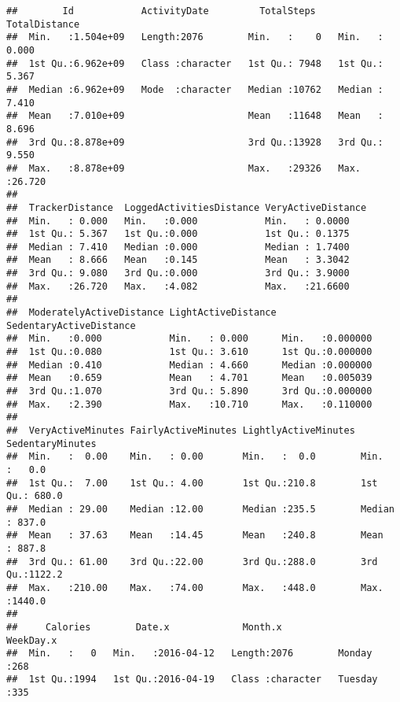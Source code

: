 \documentclass[
]{article}
\begin{document}
\begin{verbatim}
##        Id            ActivityDate         TotalSteps    TotalDistance   
##  Min.   :1.504e+09   Length:2076        Min.   :    0   Min.   : 0.000  
##  1st Qu.:6.962e+09   Class :character   1st Qu.: 7948   1st Qu.: 5.367  
##  Median :6.962e+09   Mode  :character   Median :10762   Median : 7.410  
##  Mean   :7.010e+09                      Mean   :11648   Mean   : 8.696  
##  3rd Qu.:8.878e+09                      3rd Qu.:13928   3rd Qu.: 9.550  
##  Max.   :8.878e+09                      Max.   :29326   Max.   :26.720  
##                                                                         
##  TrackerDistance  LoggedActivitiesDistance VeryActiveDistance
##  Min.   : 0.000   Min.   :0.000            Min.   : 0.0000   
##  1st Qu.: 5.367   1st Qu.:0.000            1st Qu.: 0.1375   
##  Median : 7.410   Median :0.000            Median : 1.7400   
##  Mean   : 8.666   Mean   :0.145            Mean   : 3.3042   
##  3rd Qu.: 9.080   3rd Qu.:0.000            3rd Qu.: 3.9000   
##  Max.   :26.720   Max.   :4.082            Max.   :21.6600   
##                                                              
##  ModeratelyActiveDistance LightActiveDistance SedentaryActiveDistance
##  Min.   :0.000            Min.   : 0.000      Min.   :0.000000       
##  1st Qu.:0.080            1st Qu.: 3.610      1st Qu.:0.000000       
##  Median :0.410            Median : 4.660      Median :0.000000       
##  Mean   :0.659            Mean   : 4.701      Mean   :0.005039       
##  3rd Qu.:1.070            3rd Qu.: 5.890      3rd Qu.:0.000000       
##  Max.   :2.390            Max.   :10.710      Max.   :0.110000       
##                                                                      
##  VeryActiveMinutes FairlyActiveMinutes LightlyActiveMinutes SedentaryMinutes
##  Min.   :  0.00    Min.   : 0.00       Min.   :  0.0        Min.   :   0.0  
##  1st Qu.:  7.00    1st Qu.: 4.00       1st Qu.:210.8        1st Qu.: 680.0  
##  Median : 29.00    Median :12.00       Median :235.5        Median : 837.0  
##  Mean   : 37.63    Mean   :14.45       Mean   :240.8        Mean   : 887.8  
##  3rd Qu.: 61.00    3rd Qu.:22.00       3rd Qu.:288.0        3rd Qu.:1122.2  
##  Max.   :210.00    Max.   :74.00       Max.   :448.0        Max.   :1440.0  
##                                                                             
##     Calories        Date.x             Month.x              WeekDay.x  
##  Min.   :   0   Min.   :2016-04-12   Length:2076        Monday   :268  
##  1st Qu.:1994   1st Qu.:2016-04-19   Class :character   Tuesday  :335  

\end{verbatim}
\end{document}
